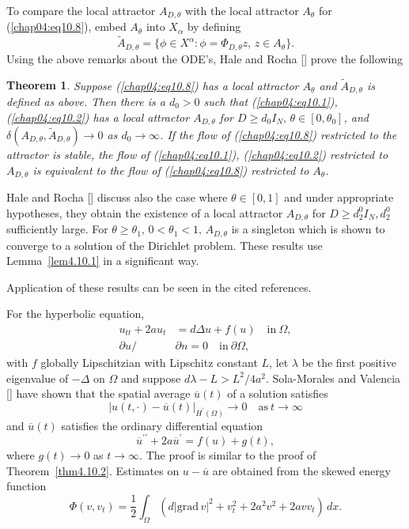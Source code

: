 \documentclass{surv-l}
\theoremstyle{plain}
\newtheorem{theorem}{Theorem}[section]
\theoremstyle{definition}
\numberwithin{equation}{section}
\numberwithin{figure}{chapter}
\begin{document}
To compare the local attractor $A_{D,\theta}$ with the local attractor $A_{\theta}$ for (\ref{chap04:eq10.8}), embed $A_{\theta}$ into $X_{\alpha}$ by defining
\begin{equation*}
\tilde{A}_{D,\theta}=\{\phi\in X^{\alpha}:\phi =\Phi_{D,\theta}z,\, z\in A_{\theta}\}.
\end{equation*}
Using the above remarks about the ODE's, Hale and Rocha [\citeyear{1987hra}] prove the following

\begin{theorem}\label{thm4.10.3} Suppose \emph{(\ref{chap04:eq10.8})} has a local attractor $A_{\theta}$ and $\tilde{A}_{D,\theta}$ is defined as above. Then there is a $d_{0}>0$ such that \emph{(\ref{chap04:eq10.1})}, \emph{(\ref{chap04:eq10.2})} has a local attractor $A_{D,\theta}$ for $D\geq d_{0}I_{N},\, \theta\in[0, \theta_{0}]$, and $\delta(A_{D,\theta},\tilde{A}_{D,\theta})\rightarrow 0$ as $ d_{0}\rightarrow\infty$. If the flow of \emph{(\ref{chap04:eq10.8})} restricted to the attractor is stable, the flow of \emph{(\ref{chap04:eq10.1})}, \emph{(\ref{chap04:eq10.2})} restricted to $A_{D,\theta}$ is equivalent to the flow of \emph{(\ref{chap04:eq10.8})} restricted to $A_{\theta}$.
\end{theorem}
Hale and Rocha [\citeyear{1987hrb}] discuss also the case where $\theta\in[0,1]$ and under appropriate hypotheses, they obtain the existence of a local attractor $A_{D,\theta}$ for $D\geq d_{2}^{0}I_{N}, d_{2}^{0}$ sufficiently large. For $\theta\geq\theta_{1},\, 0<\theta_{1}<1,\, A_{D,\theta}$ is a singleton which is shown to converge to a solution of the Dirichlet problem. These results use Lemma~\ref{lem4.10.1} in a significant way.

Application of these results can be seen in the cited references.

For the hyperbolic equation,
\begin{align*}
u_{tt}+2au_{t}&=d\Delta u+f(u)\quad \mathrm{in}\ \Omega,\\
\partial u/&\partial n=0\quad \mathrm{in}\ \partial\Omega,
\end{align*}
with $f$ globally Lipschitzian with Lipschitz constant $L$, let $\lambda$ be the first positive eigenvalue  of ${-}\Delta$ on $\Omega$ and suppose $d\lambda-L>L^{2}/4a^{2}$. Sola-Morales and Valencia [\citeyear{1986sv}] have shown that the spatial average $\overline{u}(t)$ of a solution satisfies
\begin{equation*}
|u(t, \cdot)-\overline{u}(t)|_{H^{\prime}(\Omega)}\rightarrow 0\quad \mathrm{as}\ t\rightarrow\infty
\end{equation*}
and $\overline{u}(t)$ satisfies the ordinary differential equation
\begin{equation*}
\overline{u}^{\prime\prime}+2a\overline{u}^{\prime}=f(u)+g(t),
\end{equation*}
where $g(t)\rightarrow 0$ as $ t\rightarrow\infty$. The proof is similar to the proof of Theorem~\ref{thm4.10.2}. Estimates on $u-\overline{u}$ are obtained from the skewed energy function
\begin{equation*}
\Phi(v, v_{t})=\frac{1}{2}\int_{\Omega}(d|\mathrm{grad}\,v|^{2}+v_{t}^{2}+2a^{2}v^{2}+2avv_{t})\, dx.
\end{equation*}
\end{document}
